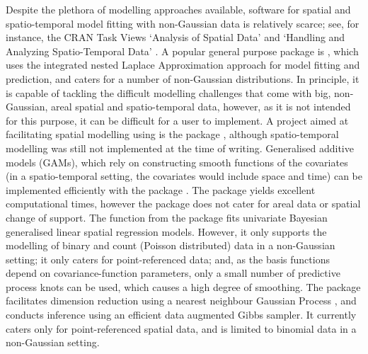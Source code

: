 \documentclass[article]{jss}
\newcommand{\fct}[1]{\code{#1()}}
\begin{document}
Despite the plethora of modelling approaches available, software for spatial and spatio-temporal model fitting with non-Gaussian data is relatively scarce; see, for instance, the CRAN Task Views `Analysis of Spatial Data' \citep{CRAN_Task_View:spatial} and `Handling and Analyzing Spatio-Temporal Data' \citep{CRAN_Task_View:spatio-temporal}. 
A popular general purpose  package is  \citep{Lindgren_2015_R-INLA}, which uses the integrated nested Laplace Approximation \citep{Rue_2009_INLA} approach for model fitting and prediction, and caters for a number of non-Gaussian distributions. 
In principle, it is capable of tackling the difficult modelling challenges that come with big, non-Gaussian, areal spatial and spatio-temporal data, however, as it is not intended for this purpose, it can be difficult for a user to implement. 
A project aimed at facilitating spatial modelling using  is the  package \citep{Bachl_2019_inlabru}, although spatio-temporal modelling was still not implemented at the time of writing.
Generalised additive models (GAMs), which rely on constructing smooth functions of the covariates (in a spatio-temporal setting, the covariates would include space and time) can be implemented efficiently with the package  \citep{Wood_2017_GAM:R}. 
The package yields excellent computational times, however the package does not cater for areal data or spatial change of support.
The function \fct{spGLM} from the package  \citep{Finley_2015_spBayes} fits univariate Bayesian generalised linear spatial regression models. 
However, it only supports the modelling of binary and count (Poisson distributed) data in a non-Gaussian setting; it only caters for point-referenced data; and, as the basis functions depend on covariance-function parameters, only a small number of predictive process knots can be used, which causes a high degree of smoothing.
The package  \citep{Finley_2020_spNNGP} facilitates dimension reduction using a nearest neighbour Gaussian Process \citep{Datta_2016_NNGP_spatial}, and conducts inference using an efficient data augmented Gibbs sampler. 
 It currently caters only for point-referenced spatial data, and is limited to binomial data in a non-Gaussian setting. 
 
 
\end{document}
